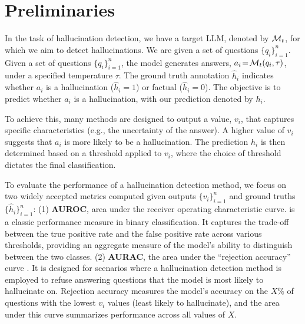 \section{Preliminaries}

In the task of hallucination detection, we have a target LLM, denoted by ${\mathcal{M}}_t$, for which we aim to detect hallucinations.  We are given a set of questions $\{q_i\}_{i=1}^n$. Given a set of questions $\{q_i\}_{i=1}^n$, the model generates answers, $a_i\! =\! {\mathcal{M}}_t(q_i, \tau)$, under a specified temperature $\tau$. The ground truth annotation $\hat{h}_i$ indicates whether $a_i$ is a hallucination ($\hat{h}_i = 1$) or factual ($\hat{h}_i = 0$).  The objective is to predict whether $a_i$ is a hallucination, with our prediction denoted by $h_i$. 

To achieve this, many methods are designed to output a value, $v_i$, that captures specific characteristics (e.g., the uncertainty of the answer). A higher value of $v_i$ suggests that $a_i$ is more likely to be a hallucination. The prediction $h_i$ is then determined based on a threshold applied to $v_i$, where the choice of threshold dictates the final classification.

To evaluate the performance of a hallucination detection method, we focus on two widely accepted metrics computed given outputs $\{v_i\}_{i=1}^n$ and ground truths $\{\hat{h}_i\}_{i=1}^n$: (1) \textbf{AUROC}, area under the receiver operating characteristic curve. is a classic performance measure in binary classification. It captures the trade-off between the true positive rate and the false positive rate across various thresholds, providing an aggregate measure of the model's ability to distinguish between the two classes. (2) \textbf{AURAC}, the area under the ``rejection accuracy'' curve \cite{farquhar2024detecting}. It is designed for scenarios where a hallucination detection method is employed to refuse answering questions that the model is most likely to hallucinate on. Rejection accuracy measures the model's accuracy on the $X$\% of questions with the lowest $v_i$ values (least likely to hallucinate), and the area under this curve summarizes performance across all values of $X$.
\vspace{-.2cm}

